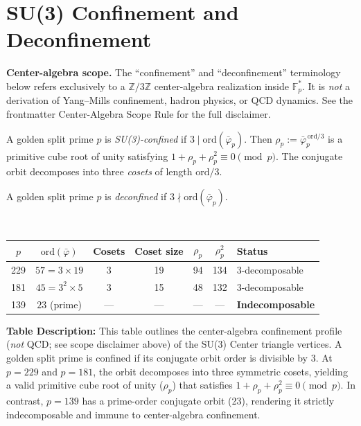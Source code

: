 \section{SU(3) Confinement and Deconfinement}
\label{sec:confinement}

\textbf{Center-algebra scope.} The ``confinement'' and ``deconfinement'' terminology below refers exclusively to a $\mathbb{Z}/3\mathbb{Z}$ center-algebra realization inside $\mathbb{F}_p^*$. It is \emph{not} a derivation of Yang--Mills confinement, hadron physics, or QCD dynamics. See the frontmatter Center-Algebra Scope Rule for the full disclaimer.

\begin{definition}[SU(3) confinement]
A golden split prime $p$ is \emph{SU(3)-confined} if
$3 \mid \mathrm{ord}(\bar\varphi_p)$.
Then $\rho_p := \bar\varphi_p^{\,\mathrm{ord}/3}$
is a primitive cube root of unity satisfying
$1 + \rho_p + \rho_p^2 \equiv 0 \pmod{p}$.
The conjugate orbit decomposes into three \emph{cosets}
of length $\mathrm{ord}/3$.
\end{definition}

\begin{definition}[Deconfinement]
A golden split prime $p$ is \emph{deconfined} if
$3 \nmid \mathrm{ord}(\bar\varphi_p)$.
\end{definition}

\begin{result}
\label{res:confinement}
~
\begin{center}
\begin{tabular}{@{}ccccccl@{}}
\toprule
$p$ & $\mathrm{ord}(\bar\varphi)$ & Cosets & Coset size
    & $\rho_p$ & $\rho_p^2$ & Status \\
\midrule
229 & $57 = 3 \times 19$ & 3 & 19 & 94 & 134 & 3-decomposable \\
181 & $45 = 3^2 \times 5$ & 3 & 15 & 48 & 132 & 3-decomposable \\
139 & $23$ (prime) & --- & --- & --- & --- & \textbf{Indecomposable} \\
\bottomrule
\end{tabular}
\end{center}
\textbf{Table Description:} This table outlines the center-algebra confinement profile (\emph{not} QCD; see scope disclaimer above) of the SU(3) Center triangle vertices. A golden split prime is confined if its conjugate orbit order is divisible by 3. At $p=229$ and $p=181$, the orbit decomposes into three symmetric cosets, yielding a valid primitive cube root of unity ($\rho_p$) that satisfies $1 + \rho_p + \rho_p^2 \equiv 0 \pmod{p}$. In contrast, $p=139$ has a prime-order conjugate orbit (23), rendering it strictly indecomposable and immune to center-algebra confinement.
\end{result}

